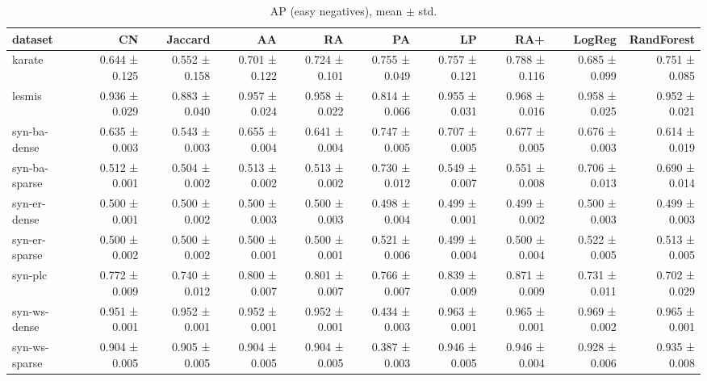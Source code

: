 \begin{table}[t]
\centering
\caption{AP (easy negatives), mean $\pm$ std.}
\label{tab:main_ap_easy}
\begin{tabular}{lrrrrrrrrr}
\hline
dataset & CN & Jaccard & AA & RA & PA & LP & RA+ & LogReg & RandForest \\
\hline
karate & 0.644 ± 0.125 & 0.552 ± 0.158 & 0.701 ± 0.122 & 0.724 ± 0.101 & 0.755 ± 0.049 & 0.757 ± 0.121 & 0.788 ± 0.116 & 0.685 ± 0.099 & 0.751 ± 0.085 \\
lesmis & 0.936 ± 0.029 & 0.883 ± 0.040 & 0.957 ± 0.024 & 0.958 ± 0.022 & 0.814 ± 0.066 & 0.955 ± 0.031 & 0.968 ± 0.016 & 0.958 ± 0.025 & 0.952 ± 0.021 \\
syn-ba-dense & 0.635 ± 0.003 & 0.543 ± 0.003 & 0.655 ± 0.004 & 0.641 ± 0.004 & 0.747 ± 0.005 & 0.707 ± 0.005 & 0.677 ± 0.005 & 0.676 ± 0.003 & 0.614 ± 0.019 \\
syn-ba-sparse & 0.512 ± 0.001 & 0.504 ± 0.002 & 0.513 ± 0.002 & 0.513 ± 0.002 & 0.730 ± 0.012 & 0.549 ± 0.007 & 0.551 ± 0.008 & 0.706 ± 0.013 & 0.690 ± 0.014 \\
syn-er-dense & 0.500 ± 0.001 & 0.500 ± 0.002 & 0.500 ± 0.003 & 0.500 ± 0.003 & 0.498 ± 0.004 & 0.499 ± 0.001 & 0.499 ± 0.002 & 0.500 ± 0.003 & 0.499 ± 0.003 \\
syn-er-sparse & 0.500 ± 0.002 & 0.500 ± 0.002 & 0.500 ± 0.001 & 0.500 ± 0.001 & 0.521 ± 0.006 & 0.499 ± 0.004 & 0.500 ± 0.004 & 0.522 ± 0.005 & 0.513 ± 0.005 \\
syn-plc & 0.772 ± 0.009 & 0.740 ± 0.012 & 0.800 ± 0.007 & 0.801 ± 0.007 & 0.766 ± 0.007 & 0.839 ± 0.009 & 0.871 ± 0.009 & 0.731 ± 0.011 & 0.702 ± 0.029 \\
syn-ws-dense & 0.951 ± 0.001 & 0.952 ± 0.001 & 0.952 ± 0.001 & 0.952 ± 0.001 & 0.434 ± 0.003 & 0.963 ± 0.001 & 0.965 ± 0.001 & 0.969 ± 0.002 & 0.965 ± 0.001 \\
syn-ws-sparse & 0.904 ± 0.005 & 0.905 ± 0.005 & 0.904 ± 0.005 & 0.904 ± 0.005 & 0.387 ± 0.003 & 0.946 ± 0.005 & 0.946 ± 0.004 & 0.928 ± 0.006 & 0.935 ± 0.008 \\
\hline
\end{tabular}
\end{table}